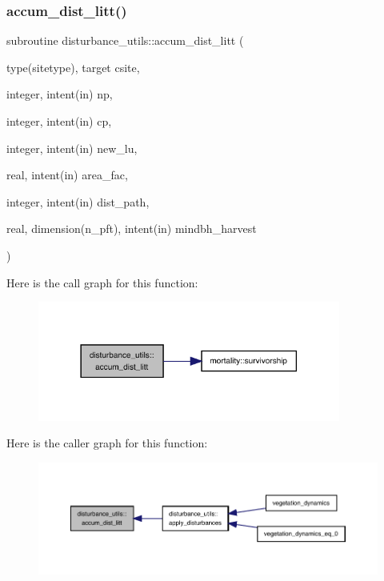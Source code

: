 \subsubsection{\texorpdfstring{accum\+\_\+dist\+\_\+litt()}{accum\_dist\_litt()}}
{\footnotesize\ttfamily subroutine disturbance\+\_\+utils\+::accum\+\_\+dist\+\_\+litt (\begin{DoxyParamCaption}\item[{type(sitetype), target}]{csite,  }\item[{integer, intent(in)}]{np,  }\item[{integer, intent(in)}]{cp,  }\item[{integer, intent(in)}]{new\+\_\+lu,  }\item[{real, intent(in)}]{area\+\_\+fac,  }\item[{integer, intent(in)}]{dist\+\_\+path,  }\item[{real, dimension(n\+\_\+pft), intent(in)}]{mindbh\+\_\+harvest }\end{DoxyParamCaption})}

Here is the call graph for this function\+:
\nopagebreak
\begin{figure}[H]
\begin{center}
\leavevmode
\includegraphics[width=282pt]{namespacedisturbance__utils_a5e78ef6d3bd2f31c0abfaf8e86045187_cgraph}
\end{center}
\end{figure}
Here is the caller graph for this function\+:
\nopagebreak
\begin{figure}[H]
\begin{center}
\leavevmode
\includegraphics[width=350pt]{namespacedisturbance__utils_a5e78ef6d3bd2f31c0abfaf8e86045187_icgraph}
\end{center}
\end{figure}
\mbox{\label{namespacedisturbance__utils_a29d6db4e94463404643e5c3666c67767}} 
